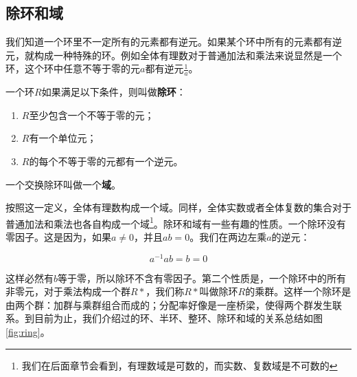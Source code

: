 \documentclass{article}
\begin{document}
\begin{Exercise}
\end{Exercise}

\subsection{除环和域}

我们知道一个环里不一定所有的元素都有逆元。如果某个环中所有的元素都有逆元，就构成一种特殊的环。例如全体有理数对于普通加法和乘法来说显然是一个环，这个环中任意不等于零的元$a$都有逆元$\frac{1}{a}$。

\begin{definition}
一个环$R$如果满足以下条件，则叫做\textbf{除环}：
\begin{enumerate}
\item $R$至少包含一个不等于零的元；
\item $R$有一个单位元；
\item $R$的每个不等于零的元都有一个逆元。
\end{enumerate}
\end{definition}

\begin{definition}
一个交换除环叫做一个\textbf{域}。
\end{definition}

按照这一定义，全体有理数构成一个域。同样，全体实数或者全体复数的集合对于普通加法和乘法也各自构成一个域\footnote{我们在后面章节会看到，有理数域是可数的，而实数、复数域是不可数的}。除环和域有一些有趣的性质。一个除环没有零因子。这是因为，如果$a \neq 0$，并且$ab = 0$。我们在两边左乘$a$的逆元：

\[
a^{-1}ab = b = 0
\]

这样必然有$b$等于零，所以除环不含有零因子。第二个性质是，一个除环中的所有非零元，对于乘法构成一个群$R*$，我们称$R*$叫做除环$R$的乘群。这样一个除环是由两个群：加群与乘群组合而成的；分配率好像是一座桥梁，使得两个群发生联系。到目前为止，我们介绍过的环、半环、整环、除环和域的关系总结如图\ref{fig:ring}。
\end{document}
